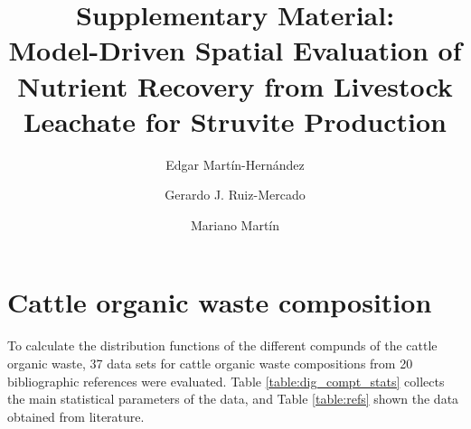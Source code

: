 \documentclass[10pt,a4paper]{article}
\begin{document}
	\title{Supplementary Material: \\ Model-Driven Spatial Evaluation of Nutrient Recovery from Livestock Leachate for Struvite Production}
	
	\author[a,b]{Edgar Mart\'{i}n-Hern\'{a}ndez}
	\author[c]{Gerardo J. Ruiz-Mercado}
	\author[a,*]{Mariano Mart\'{i}n}
	
	
	
	
	\affil[ ]{}
	
	
	\date{}
	
	\maketitle
	
	\tableofcontents
	
\section{Cattle organic waste composition} \label{comp_dist}
To calculate the distribution functions of the different compunds of the cattle organic waste, 37 data sets for cattle organic waste compositions from 20 bibliographic references were evaluated. Table \ref{table:dig_compt_stats} collects the main statistical parameters of the data, and Table \ref{table:refs} shown the data obtained from literature.
\end{document}
